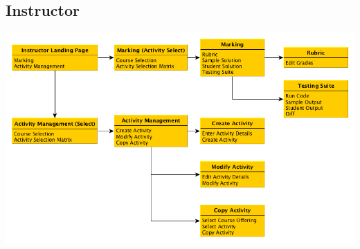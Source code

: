 \documentclass{article}
\begin{document}
\subsection{Instructor}
\centerline{\includegraphics[scale=.6]{../images/UIMockups/pngs/instructor}}
\end{document}
